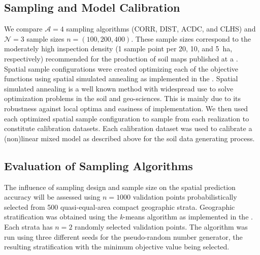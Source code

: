 \subsection{Sampling and Model Calibration}

We compare $\mathcal{A} = 4$ sampling algorithms (CORR, DIST, ACDC, and CLHS) and $\mathcal{N} = 3$ sample 
sizes $n = (100, 200, 400)$. These sample sizes correspond to the moderately high inspection density (1 sample 
point per 20, 10, and \SI{5}{\hectare}, respectively) recommended for the production of soil maps published at 
a  \cite{Rossiter2000}. Spatial sample configurations were created optimizing each of the 
objective functions using spatial simulated annealing as implemented in the . Spatial 
simulated annealing is a well known method with widespread use to solve optimization problems in the soil and 
geo-sciences. This is mainly due to its robustness against local optima and easiness of implementation. We then 
used each optimized spatial sample configuration to sample from each realization to constitute calibration 
datasets. Each calibration dataset was used to calibrate a (non)linear mixed model as described above for the 
soil data generating process.

\subsection{Evaluation of Sampling Algorithms}

The influence of sampling design and sample size on the spatial prediction accuracy will be assessed using 
$n = 1000$ validation points probabilistically selected from 500 quasi-equal-area compact geographic strata. 
Geographic stratification was obtained using the \textit{k}-means algorithm as implemented in the 
 \cite{WalvoortEtAl2010}. Each strata has $n = 2$ randomly selected validation points. The 
algorithm was run using three different seeds for the pseudo-random number generator, the resulting 
stratification with the minimum objective value being selected.

